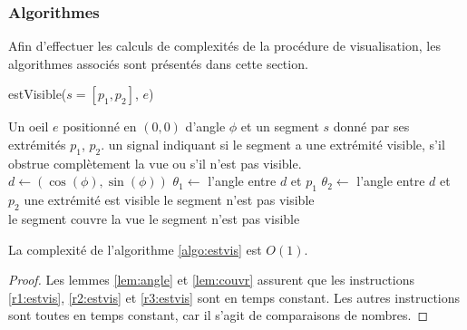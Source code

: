 \subsubsection*{Algorithmes}

Afin d'effectuer les calculs de complexités de la procédure
de visualisation, les algorithmes associés sont présentés
dans cette section.

\begin{algorithm}
  \caption{estVisible($s=[p_1, p_2]$, $e$)}\label{algo:estvis}
  \begin{algorithmic}[1]
    \REQUIRE Un oeil $e$ positionné en $(0, 0)$ d'angle $\phi$ et un segment $s$
    donné par ses extrémités $p_1$, $p_2$.
    \ENSURE un signal indiquant si le segment a une extrémité visible,
    s'il obstrue complètement la vue ou s'il n'est pas visible.
    \STATE $d\leftarrow (\cos(\phi), \sin(\phi))$
    \STATE $\theta_1\leftarrow$ l'angle entre $d$ et $p_1$ \label{r1:estvis}
    \STATE $\theta_2\leftarrow$ l'angle entre $d$ et $p_2$ \label{r2:estvis}
    \IF{$\theta_1\in[-\pi/4, \pi/4]\lor \theta_2\in[-\pi/4, \pi/4]$}
    \RETURN \og{}une extrémité est visible\fg{}
    \RETURN \og le segment n'est pas visible \fg \\
     \label{r3:estvis}
    \RETURN \og le segment couvre la vue\fg
    \ELSE
    \RETURN \og le segment n'est pas visible \fg
    \ENDIF
  \end{algorithmic}
\end{algorithm}

\begin{prop}
  La complexité de l'algorithme \ref{algo:estvis} est $O(1)$.
\end{prop}
\begin{proof}
  Les lemmes \ref{lem:angle} et \ref{lem:couvr} assurent que
  les instructions \ref{r1:estvis}, \ref{r2:estvis} et \ref{r3:estvis} sont en temps
  constant. Les autres instructions sont toutes en temps constant, car il s'agit
  de comparaisons de nombres.
\end{proof}

